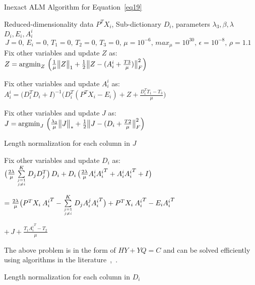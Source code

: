 \documentclass[journal]{IEEEtran}
\makeatletter
\def\NoNumber#1{{\def\alglinenumber##1{}\State #1}\addtocounter{ALG@line}{-1}}
\DeclareMathOperator*{\argmin}{\arg\!\min}
\DeclarePairedDelimiter\norm{\lVert}{\rVert}
\makeatother
\begin{document}
\begin{algorithm}[h]
\footnotesize
\caption{Inexact ALM Algorithm for Equation~\eqref{eq19}}
\label{alg1-update-di}
\begin{algorithmic}[1]
\renewcommand{\algorithmicrequire}{\textbf{Input:}}
\renewcommand{\algorithmicensure}{\textbf{Output:}}
\Require Reduced-dimensionality data $P^TX_i$, Sub-dictionary $D_i$, parameters $\lambda_3, \beta, \lambda$
\Ensure $D_i, E_i, A_i^i$
\Initialize $\, J=0, \, E_i=0, \, T_1=0, \, T_2=0, \, T_3=0, \, \mu=10^{-6}, \, max_{\mu} = 10^{30}, \, \epsilon = 10^{-8}, \, \rho =1.1 $
    \State Fix other variables and update $Z$ as: 
    \vspace{2mm}
    \NoNumber{$ Z = \argmin_{Z} \, \Big( \frac{1}{\mu} \norm[\big]{Z}_{1} + \frac{1}{2} \norm[\big]{Z - (A_i^i + \frac{T3}{\mu})}_{F}^2 \Big) $}
    \vspace{2mm}    
    \State Fix other variables and update $A_i^i$ as: 
    \vspace{2mm}   
    \NoNumber{$A_i^i = \Big( D_i^TD_i +I \Big)^{-1} \Big( D_i^T(P^T X_i - E_i) +Z + \frac{D_i^T T_1 - T_3}{\mu} \Big)$}
    \vspace{2mm}    
    \State Fix other variables and update $J$ as:
    \vspace{2mm} 
    \NoNumber{$J = \argmin_{J} \, \Big( \frac{\lambda_3}{\mu} \norm[\big]{J}_{*} + \frac{1}{2} \norm[\big]{J - (D_i + \frac{T2}{\mu}}_{F}^2 \Big) $}
    \vspace{1mm}
    \NoNumber{Length normalization for each column in $J$}
    \vspace{2mm}
    \State Fix other variables and update $D_i$ as:
    \vspace{2mm}
    \NoNumber{ $\big( \frac{2 \lambda}{\mu} \sum\limits_{j=1 \atop j \neq i}^K D_j D_j^T \big) \, D_i + D_i \, \big(\frac{2 \lambda}{\mu} A_i^i {A_i^i}^T + A_i^i {A_i^i}^T + I \big)$} 
    \NoNumber{$ = \frac{2 \lambda}{\mu} \big( P^T X_i \> {A_i^i}^T - \sum\limits_{j=1 \atop j \neq i}^K D_j A_i^j {A_i^i}^T \big) + P^T X_i \> {A_i^i}^T - E_i {A_i^i}^T $}
    \NoNumber{$+ \, J + \frac{T_1 {A_i^i}^T - T_2}{\mu} $}
    \vspace{2mm}
    \NoNumber{The above problem is in the form of $HY + YQ = C$ and can be solved efficiently using algorithms in the literature~\cite{Eq-Di-1},~\cite{Eq-Di-2}.}
    \vspace{1mm}
    \NoNumber{Length normalization for each column in $D_i$}    
    \vspace{2mm}

\end{algorithmic}
\end{algorithm}
\end{document}
